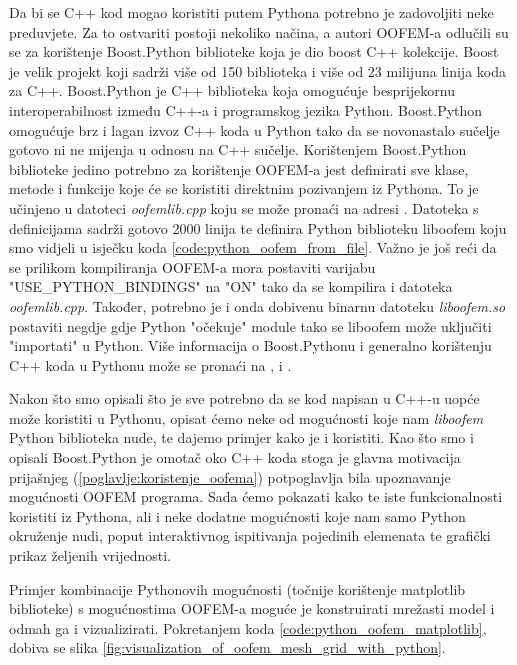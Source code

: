 \documentclass[a4paper,twoside,12pt]{memoir} %
\begin{document}
Da bi se C++ kod mogao koristiti putem Pythona potrebno je zadovoljiti neke preduvjete. Za to ostvariti postoji nekoliko načina, a autori OOFEM-a odlučili su se za korištenje Boost.Python biblioteke koja je dio boost C++ kolekcije. Boost je velik projekt koji sadrži više od 150 biblioteka i više od 23 milijuna linija koda za C++. Boost.Python je C++ biblioteka koja omogućuje besprijekornu interoperabilnost između C++-a i programskog jezika Python. Boost.Python omogućuje brz i lagan izvoz C++ koda u Python tako da se novonastalo sučelje gotovo ni ne mijenja u odnosu na C++ sučelje. Korištenjem Boost.Python biblioteke jedino potrebno za korištenje OOFEM-a jest definirati sve klase, metode i funkcije koje će se koristiti direktnim pozivanjem iz Pythona. To je učinjeno u datoteci \textit{oofemlib.cpp} koju se može pronaći na adresi \cite{oofemlib_source}. Datoteka s definicijama sadrži gotovo 2000 linija te definira Python biblioteku liboofem koju smo vidjeli u isječku koda \ref{code:python_oofem_from_file}. Važno je još reći da se prilikom kompiliranja OOFEM-a mora postaviti varijabu "USE\_PYTHON\_BINDINGS" na "ON" tako da se kompilira i datoteka \textit{oofemlib.cpp}. Također, potrebno je i onda dobivenu binarnu datoteku \textit{liboofem.so} postaviti negdje gdje Python "očekuje" module tako se liboofem može uključiti "importati" u Python. Više informacija o Boost.Pythonu i generalno korištenju C++ koda u Pythonu može se pronaći na \cite{boost_python}, \cite{ctypes} i \cite{swig}. \par

Nakon što smo opisali što je sve potrebno da se kod napisan u C++-u uopće može koristiti u Pythonu, opisat ćemo neke od mogućnosti koje nam \textit{liboofem} Python biblioteka nude, te dajemo primjer kako je i koristiti. Kao što smo i opisali Boost.Python je omotač oko C++ koda stoga je glavna motivacija prijašnjeg (\ref{poglavlje:koristenje_oofema}) potpoglavlja bila upoznavanje mogućnosti OOFEM programa. Sada ćemo pokazati kako te iste funkcionalnosti koristiti iz Pythona, ali i neke dodatne mogućnosti koje nam samo Python okruženje nudi, poput interaktivnog ispitivanja pojedinih elemenata te grafički prikaz željenih vrijednosti. \par

Primjer kombinacije Pythonovih mogućnosti (točnije korištenje matplotlib biblioteke) s mogućnostima OOFEM-a moguće je konstruirati mrežasti model i odmah ga i vizualizirati. Pokretanjem koda \ref{code:python_oofem_matplotlib}, dobiva se slika \ref{fig:visualization_of_oofem_mesh_grid_with_python}.
\end{document}

